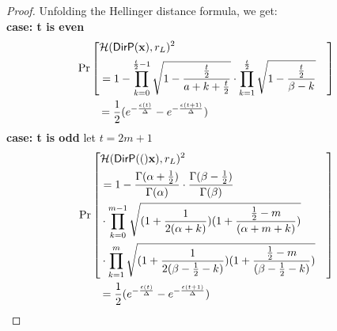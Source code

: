 \documentclass{article}
\begin{document}
\begin{proof}
Unfolding the Hellinger distance formula, we get:\\
  \noindent \textbf{case: t is even}
  \begin{align*}
  &\Pr\left[
\begin{aligned}\lefteqn{\hellinger(\bysinfer{\dataobs}, r_L )^2}\\
&= 1 - \prod_{k = 0}^{\frac{t}{2} - 1}
  \sqrt{1 - \frac{\frac{t}{2}}{a + k + \frac{t}{2}}}
  \cdot\prod_{k = 1}^{\frac{t}{2}}
  \sqrt{1 - \frac{\frac{t}{2}}{\beta - k}}
\end{aligned}
\right] \\
  &\qquad = \frac{1}{2} (e^{- \frac{\epsilon (t)}{\Delta }} - e^{- \frac{\epsilon (t + 1)}{\Delta }})
  \end{align*}
  \noindent \textbf{case: t is odd}
  let $t = 2 m + 1$
  \begin{align*}
  & \Pr\left[
  \begin{aligned}\lefteqn{\hellinger(\bysinfer(\dataobs), r_L )^2} \\
  & =
  1 - \frac{\Gamma(\alpha+\frac{1}{2})}{\Gamma(\alpha)} \cdot
\frac{\Gamma(\beta - \frac{1}{2})}{\Gamma(\beta)}\\
&\cdot 
  \prod_{k = 0}^{m-1}
  \sqrt{(1 + \frac{1}{2(\alpha + k)})
  (1 + \frac{\frac{1}{2} - m}{(\alpha + m  + k)})
  }\\ &\cdot 
  \prod_{k = 1}^{m} 
  \sqrt{(1 + \frac{1}{2(\beta - \frac{1}{2}- k)})(1 + \frac{\frac{1}{2} - m}{(\beta - \frac{1}{2}- k)})} \end{aligned}
\right] \\
   &\qquad = \frac{1}{2} (e^{- \frac{\epsilon (t)}{\Delta }} - e^{- \frac{\epsilon (t + 1)}{\Delta }})
  \end{align*}

\end{proof}
\end{document}
